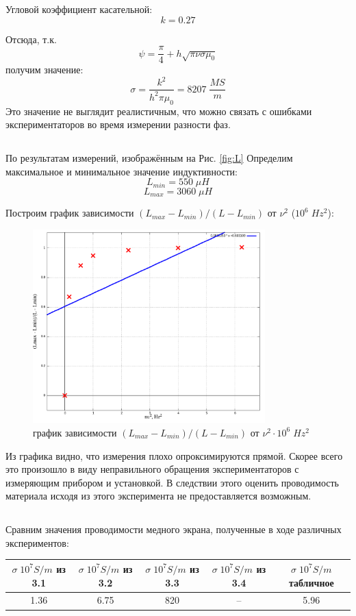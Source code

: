\documentclass{article}
\begin{document}
Угловой коэффициент касательной:
\[ k = 0.27 \]

Отсюда, т.к.
\[ \psi = \frac{\pi}{4} + h\sqrt{\pi\nu\sigma\mu_0}\]
получим значение:
\[ \sigma = \frac{k^2}{h^2\pi\mu_0} = 8207\; \frac{MS}{m}\]
Это значение не выглядит реалистичным, что можно связать с ошибками экспериментаторов во время
измерении разности фаз.

\subsection{} \label{sigma_4}
По результатам измерений, изображённым на Рис. \ref{fig:L} Определим максимальное и минимальное значение индуктивности:
\[ L_{min} = 550\; \mu H \]
\[ L_{max} = 3060\; \mu H \]

Построим график зависимости \( (L_{max} - L_{min})/(L - L_{min}) \) от \(\nu^2\) (\(10^6\; Hz^2\)):
\begin{figure}[H]
    \centering
    \includegraphics[width=0.8\textwidth]{L.png}
    \caption{график зависимости \( (L_{max} - L_{min})/(L - L_{min})\) от \(\nu^2 \cdot 10^6\; Hz^2\) \)}
\end{figure}

Из графика видно, что измерения плохо опроксимируются прямой. Скорее всего это произошло в виду
неправильного обращения экспериментаторов с измеряющим прибором и установкой. В следствии этого
оценить проводимость материала исходя из этого эксперимента не предоставляется возможным.

\subsection{}

Сравним значения проводимости медного экрана, полученные в ходе различных экспериментов:
\begin{table}[H]
    \centering
    \begin{tabular}{|c|c|c|c|c|}
        \hline
        \(\sigma\; 10^7 S/m\) из 3.1 & \(\sigma\; 10^7 S/m\) из 3.2  & \(\sigma\; 10^7 S/m\) из 3.3  & \(\sigma\; 10^7 S/m\) из 3.4&  \(\sigma\; 10^7 S/m\) табличное\\\hline
        1.36 & 6.75 & 820 & -- & 5.96  \\\hline
    \end{tabular}
\end{table}
\end{document}
